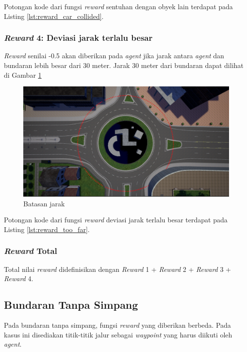 Potongan kode dari fungsi \textit{reward} sentuhan dengan obyek lain terdapat pada Listing \ref{lst:reward_car_collided}.



\subsubsection{\textit{Reward} 4: Deviasi jarak terlalu besar}
\textit{Reward} senilai -0.5 akan diberikan pada \textit{agent} jika jarak antara \textit{agent} dan bundaran lebih besar dari 30 meter. Jarak 30 meter dari bundaran dapat dilihat di Gambar \ref{fig:punishment_lane_line}

\begin{figure}[H] 
	\centering
	\includegraphics[width=1\linewidth]{images/punishment_lane_line}
	\caption{Batasan jarak}
	\label{fig:punishment_lane_line}
\end{figure}

Potongan kode dari fungsi \textit{reward} deviasi jarak terlalu besar terdapat pada Listing \ref{lst:reward_too_far}.




\subsubsection{\textit{Reward }Total}
Total nilai \textit{reward} didefinisikan dengan \textit{Reward }1 + \textit{Reward }2 + \textit{Reward }3 + \textit{Reward }4.

\subsection{Bundaran Tanpa Simpang}
Pada bundaran tanpa simpang, fungsi \textit{reward} yang diberikan berbeda. Pada kasus ini disediakan titik-titik jalur sebagai \textit{waypoint} yang harus diikuti oleh \textit{agent}.

